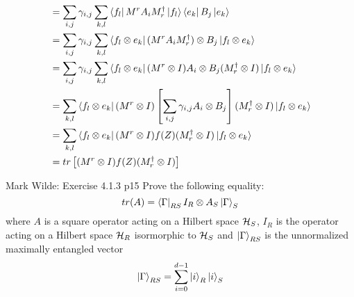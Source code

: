 \documentclass[a4paper, 11pt]{article}
\begin{document}
{\begin{enumerate}
\begin{align*}
		& = \sum_{i,j}\gamma_{i,j}\sum_{k,l}\bra{f_l}M^r A_iM_r^{\dagger}\ket{f_l}\bra{e_k}B_j\ket{e_k}\\
		& = \sum_{i,j}\gamma_{i,j}\sum_{k,l}\bra{f_l\otimes e_k}(M^r A_iM_r^{\dagger})\otimes B_j\ket{f_l\otimes e_k}\\
		& = \sum_{i,j}\gamma_{i,j}\sum_{k,l}\bra{f_l\otimes e_k}(M^r\otimes I) A_i\otimes B_j(M_r^{\dagger}\otimes I)\ket{f_l\otimes e_k}\\
		& = \sum_{k,l}\bra{f_l\otimes e_k}(M^r\otimes I)\left[\sum_{i,j}\gamma_{i,j} A_i\otimes B_j\right](M_r^{\dagger}\otimes I)\ket{f_l\otimes e_k}\\
		& = \sum_{k,l}\bra{f_l\otimes e_k}(M^r\otimes I)f(Z)(M_r^{\dagger}\otimes I)\ket{f_l\otimes e_k}\\
		& = tr\left[ (M^r\otimes I)f(Z)(M_r^{\dagger}\otimes I) \right]
		\end{align*}
\end{enumerate}
}


\begin{problem}{%
		Mark Wilde: Exercise 4.1.3
	}{p15%
	}
	 Prove the following equality:$$tr(A)=\bra{\Gamma}_{RS}I_R\otimes A_S\ket{\Gamma}_S$$where $A$ is a square operator acting on a Hilbert space $\mathcal{H}_S$, $I_R$  is the operator acting on a Hilbert space $\mathcal{H}_R$ isormorphic to $\mathcal{H}_S$ and $\ket{\Gamma}_{RS}$ is the unnormalized  maximally entangled  vector $$\ket{\Gamma}_{RS}=\sum_{i=0}^{d-1}\ket{i}_R\ket{i}_S$$
\end{problem}

\end{document}
